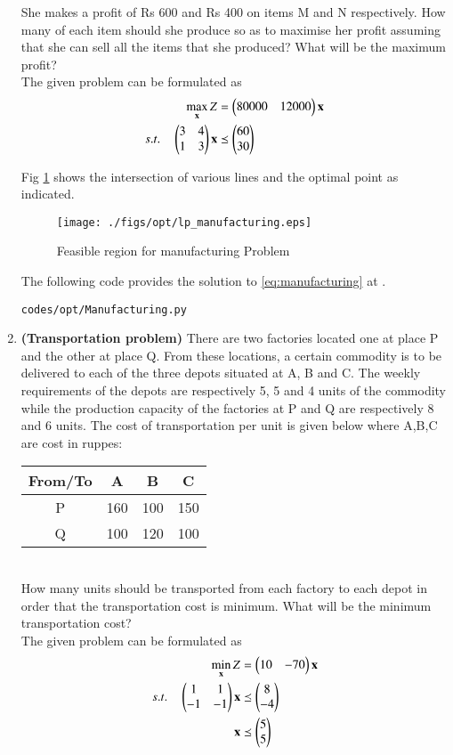 \begin{enumerate}[label=\thesection.\arabic*.,ref=\thesection.\theenumi]
She makes a profit of Rs 600 and Rs 400 on items M and N respectively. How many
of each item should she produce so as to maximise her profit assuming that she can sell
all the items that she produced? What will be the maximum profit?
\\
\solution The given problem can be formulated as
\begin{align}
\max_{\mathbf{x}} Z &= \begin{pmatrix}80000&12000\end{pmatrix}\mathbf{x}
\\
s.t. \quad 
\begin{pmatrix}
3 & 4
\\
1 & 3
\end{pmatrix}
\mathbf{x} & \preceq \begin{pmatrix}60\\30\end{pmatrix}
\label{eq:manufacturing}
\end{align}

Fig  \ref{fig:manufacturing}
shows the intersection of various lines and the optimal point as indicated.
\begin{figure}[h]
\texttt{[image: ./figs/opt/lp\_manufacturing.eps]}
\caption{Feasible region for manufacturing Problem}
\label{fig:manufacturing}
\end{figure}

The following code provides the solution to \eqref{eq:manufacturing} at .
%
\begin{lstlisting}
codes/opt/Manufacturing.py
\end{lstlisting}

\item \textbf{(Transportation problem)} There are two factories located one at
place P and the other at place Q. From these locations, a certain commodity is to be
delivered to each of the three depots situated at A, B and C. The weekly requirements
of the depots are respectively 5, 5 and 4 units of the commodity while the production
capacity of the factories at P and Q are respectively 8 and 6 units. The cost of transportation per unit is given below where A,B,C are cost in ruppes:\\
\begin{tabular}{|c|c|c|c|}
\hline
From/To & A & B & C\\
\hline
P & 160 & 100 & 150\\
\hline
Q & 100 &120 & 100\\
\hline
\end{tabular}\\
How many units should be transported from each factory to each depot in order that
the transportation cost is minimum. What will be the minimum transportation cost?
\\
\solution The given problem can be formulated as
\begin{align}
\min_{\mathbf{x}} Z &= \begin{pmatrix}10 & -70\end{pmatrix}\mathbf{x}
\\
s.t. \quad 
\begin{pmatrix}
1 & 1
\\
-1 & -1
\end{pmatrix}
\mathbf{x} & \preceq \begin{pmatrix}8\\-4\end{pmatrix}
\\
\mathbf{x} &\preceq \begin{pmatrix}5\\5\end{pmatrix}
\label{eq:transport}
\end{align}


\end{enumerate}
